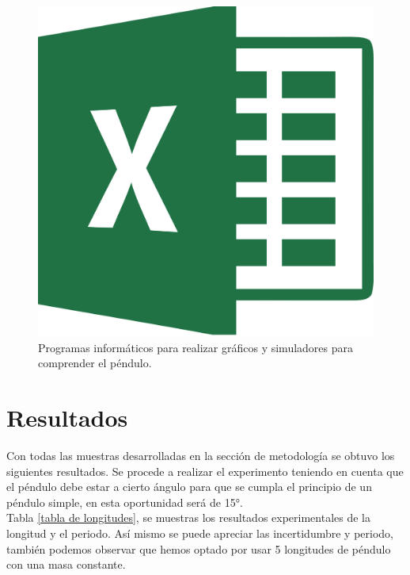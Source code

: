 \documentclass[10pt,a4paper]{article}
\begin{document}
\begin{multicols}{2}
\begin{figure}[H]
\raggedleft
\includegraphics[scale=0.03]{imagenes-proyecto/excel.png}
\captionsetup{justification=centering}
\caption{Programas informáticos para realizar gráficos y simuladores para comprender el péndulo.}
\label{programas}
\end{figure}

\section{Resultados}
Con todas las muestras desarrolladas en la sección de metodología se obtuvo los siguientes resultados. Se procede a realizar el experimento teniendo en cuenta que el péndulo debe estar a cierto ángulo para que se cumpla el principio de un péndulo simple, en esta oportunidad será de 15°.\\

Tabla \ref{tabla de longitudes}, se muestras los resultados experimentales de la longitud y el periodo. Así mismo se puede apreciar las incertidumbre y periodo, también podemos observar que hemos optado por usar 5 longitudes de péndulo con una masa constante.


\end{multicols}
\end{document}
